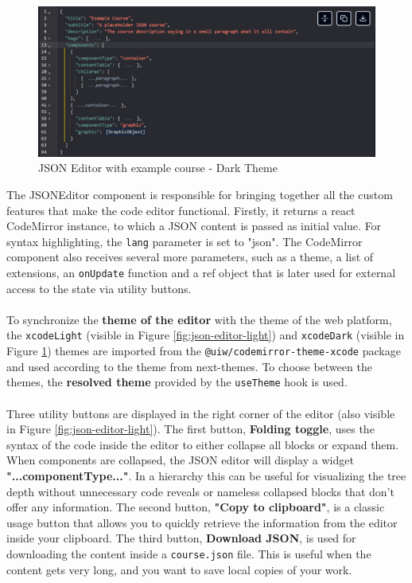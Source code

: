\begin{figure}[h]
    \centering
    \includegraphics[scale=0.63]{images/json-editor-dark.png}
    \caption{JSON Editor with example course - Dark Theme}
    \label{fig:json-editor-dark}
\end{figure}
\newpage
\noindent The JSONEditor component is responsible for bringing together all the custom features that make the code editor functional. Firstly, it returns a react CodeMirror instance, to which a JSON content is passed as initial value. For syntax highlighting, the \texttt{lang} parameter is set to "json". The CodeMirror component also receives several more parameters, such as a theme, a list of extensions, an \texttt{onUpdate} function and a ref object that is later used for external access to the state via utility buttons.
\\\\
\noindent To synchronize the \textbf{theme of the editor} with the theme of the web platform, the \texttt{xcodeLight} (visible in Figure \ref{fig:json-editor-light}) and \texttt{xcodeDark} (visible in Figure \ref{fig:json-editor-dark}) themes are imported from the \texttt{@uiw/codemirror-theme-xcode} package and used according to the theme from next-themes. To choose between the themes, the \textbf{resolved theme} provided by the \texttt{useTheme} hook is used.
\\\\
\noindent Three utility buttons are displayed in the right corner of the editor (also visible in Figure \ref{fig:json-editor-light}). The first button, \textbf{Folding toggle}, uses the syntax of the code inside the editor to either collapse all blocks or expand them. When components are collapsed, the JSON editor will display a widget \textbf{"...componentType..."}. In a hierarchy this can be useful for visualizing the tree depth without unnecessary code reveals or nameless collapsed blocks that don't offer any information. The second button, \textbf{"Copy to clipboard"}, is a classic usage button that allows you to quickly retrieve the information from the editor inside your clipboard. The third button, \textbf{Download JSON}, is used for downloading the content inside a \texttt{course.json} file. This is useful when the content gets very long, and you want to save local copies of your work.
